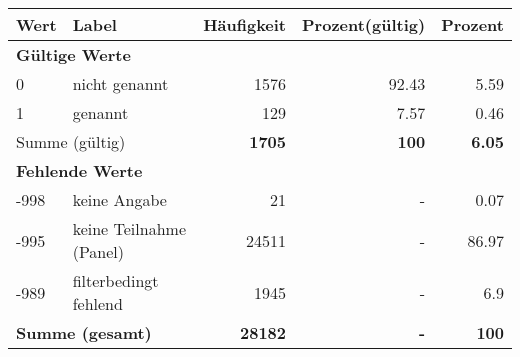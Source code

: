      \begin{longtable}{lXrrr}
     \toprule
     \textbf{Wert} & \textbf{Label} & \textbf{Häufigkeit} & \textbf{Prozent(gültig)} & \textbf{Prozent} \\
     \endhead
     \midrule
     \multicolumn{5}{l}{\textbf{Gültige Werte}}\\

     0 &
     \multicolumn{1}{X}{ nicht genannt   } &


       \num{1576} &
       \num[round-mode=places,round-precision=2]{92.43} &
         \num[round-mode=places,round-precision=2]{5.59} \\

     1 &
     \multicolumn{1}{X}{ genannt   } &


       \num{129} &
       \num[round-mode=places,round-precision=2]{7.57} &
         \num[round-mode=places,round-precision=2]{0.46} \\
     \midrule
     \multicolumn{2}{l}{Summe (gültig)} &
       \textbf{\num{1705}} &
     \textbf{\num{100}} &
       \textbf{\num[round-mode=places,round-precision=2]{6.05}} \\
     \multicolumn{5}{l}{\textbf{Fehlende Werte}}\\
       -998 &
       keine Angabe &
         \num{21} &
        - &
         \num[round-mode=places,round-precision=2]{0.07} \\
       -995 &
       keine Teilnahme (Panel) &
         \num{24511} &
        - &
         \num[round-mode=places,round-precision=2]{86.97} \\
       -989 &
       filterbedingt fehlend &
         \num{1945} &
        - &
         \num[round-mode=places,round-precision=2]{6.9} \\
     \midrule
     \multicolumn{2}{l}{\textbf{Summe (gesamt)}} &
          \textbf{\num{28182}} &
        \textbf{-} &
        \textbf{\num{100}} \\
     \bottomrule
     \end{longtable}
     
